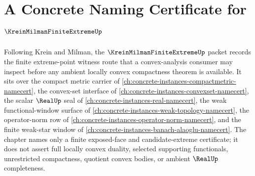 \chapter{A Concrete Naming Certificate for $\KreinMilmanFiniteExtremeUp$}
\label{ch:concrete-instances-krein-milman-finite-extreme-namecert}

Following Krein and Milman, the $\KreinMilmanFiniteExtremeUp$ packet records the finite extreme-point witness route that a convex-analysis consumer may inspect before any ambient locally convex compactness theorem is available. It sits over the compact metric carrier of \autoref{ch:concrete-instances-compactmetric-namecert}, the convex-set interface of \autoref{ch:concrete-instances-convexset-namecert}, the scalar $\RealUp$ seal of \autoref{ch:concrete-instances-real-namecert}, the weak functional-window surface of \autoref{ch:concrete-instances-weak-topology-namecert}, the operator-norm row of \autoref{ch:concrete-instances-operator-norm-namecert}, and the finite weak-star window of \autoref{ch:concrete-instances-banach-alaoglu-namecert}. The chapter names only a finite exposed-face and candidate-extreme certificate; it does not assert full locally convex duality, selected supporting functionals, unrestricted compactness, quotient convex bodies, or ambient $\RealUp$ completeness.

